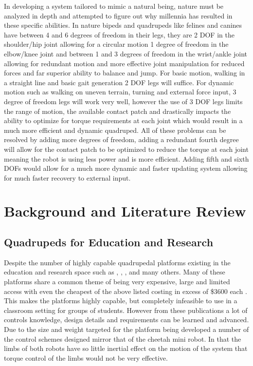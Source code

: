 \documentclass[12pt]{report}
\begin{document}
In developing a system tailored to mimic a natural being, nature must be analyzed in depth and attempted to figure out why millennia has resulted in these specific abilities. In nature bipeds and quadrupeds like felines and canines have between 4 and 6 degrees of freedom in their legs, they are 2 DOF in the shoulder/hip joint allowing for a circular motion 1 degree of freedom in the elbow/knee joint and between 1 and 3 degrees of freedom in the wrist/ankle joint allowing for redundant motion and more effective joint manipulation for reduced forces and far superior ability to balance and jump. For basic motion, walking in a straight line and basic gait generation 2 DOF legs will suffice. For dynamic motion such as walking on uneven terrain, turning and external force input, 3 degree of freedom legs will work very well, however the use of 3 DOF legs limits the range of motion, the available contact patch and drastically impacts the ability to optimize for torque requirements at each joint which would result in a much more efficient and dynamic quadruped. All of these problems can be resolved by adding more degrees of freedom, adding a redundant fourth degree will allow for the contact patch to be optimized to reduce the torque at each joint meaning the robot is using less power and is more efficient. Adding fifth and sixth DOFs would allow for a much more dynamic and faster updating system allowing for much faster recovery to external input.


\chapter{Background and Literature Review}
\section{Quadrupeds for Education and Research}
Despite the number of highly capable quadrupedal platforms existing in the education and research space such as \cite{8593885}, \cite{HyQ}, \cite{8793865}, \cite{8813480} and many others. Many of these platforms share a common theme of being very expensive, large and limited access with even the cheapest of the above listed costing in excess of \$3600 each \cite{8793865}. This makes the platforms highly capable, but completely infeasible to use in a classroom setting for groups of students. However from these publications a lot of controls knowledge, design details and requirements can be learned and advanced. Due to the size and weight targeted for the platform being developed a number of the control schemes designed mirror that of the cheetah mini robot\cite{8793865}. In that the limbs of both robots have so little inertial effect on the motion of the system that torque control of the limbs would not be very effective. 
\end{document}
